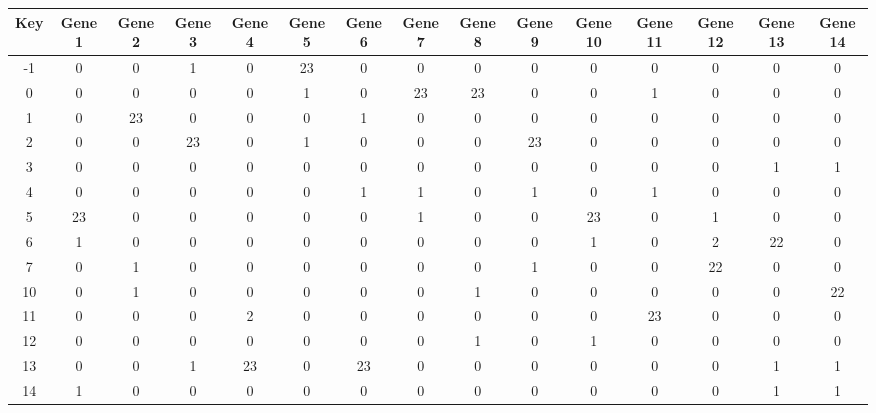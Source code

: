 \begin{tabular}{|c|c|c|c|c|c|c|c|c|c|c|c|c|c|c|}
\hline
Key & Gene 1 & Gene 2 & Gene 3 & Gene 4 & Gene 5 & Gene 6 & Gene 7 & Gene 8 & Gene 9 & Gene 10 & Gene 11 & Gene 12 & Gene 13 & Gene 14 \\
\hline
-1 & 0 & 0 & 1 & 0 & 23 & 0 & 0 & 0 & 0 & 0 & 0 & 0 & 0 & 0 \\
0 & 0 & 0 & 0 & 0 & 1 & 0 & 23 & 23 & 0 & 0 & 1 & 0 & 0 & 0 \\
1 & 0 & 23 & 0 & 0 & 0 & 1 & 0 & 0 & 0 & 0 & 0 & 0 & 0 & 0 \\
2 & 0 & 0 & 23 & 0 & 1 & 0 & 0 & 0 & 23 & 0 & 0 & 0 & 0 & 0 \\
3 & 0 & 0 & 0 & 0 & 0 & 0 & 0 & 0 & 0 & 0 & 0 & 0 & 1 & 1 \\
4 & 0 & 0 & 0 & 0 & 0 & 1 & 1 & 0 & 1 & 0 & 1 & 0 & 0 & 0 \\
5 & 23 & 0 & 0 & 0 & 0 & 0 & 1 & 0 & 0 & 23 & 0 & 1 & 0 & 0 \\
6 & 1 & 0 & 0 & 0 & 0 & 0 & 0 & 0 & 0 & 1 & 0 & 2 & 22 & 0 \\
7 & 0 & 1 & 0 & 0 & 0 & 0 & 0 & 0 & 1 & 0 & 0 & 22 & 0 & 0 \\
10 & 0 & 1 & 0 & 0 & 0 & 0 & 0 & 1 & 0 & 0 & 0 & 0 & 0 & 22 \\
11 & 0 & 0 & 0 & 2 & 0 & 0 & 0 & 0 & 0 & 0 & 23 & 0 & 0 & 0 \\
12 & 0 & 0 & 0 & 0 & 0 & 0 & 0 & 1 & 0 & 1 & 0 & 0 & 0 & 0 \\
13 & 0 & 0 & 1 & 23 & 0 & 23 & 0 & 0 & 0 & 0 & 0 & 0 & 1 & 1 \\
14 & 1 & 0 & 0 & 0 & 0 & 0 & 0 & 0 & 0 & 0 & 0 & 0 & 1 & 1 \\
\hline
\end{tabular}